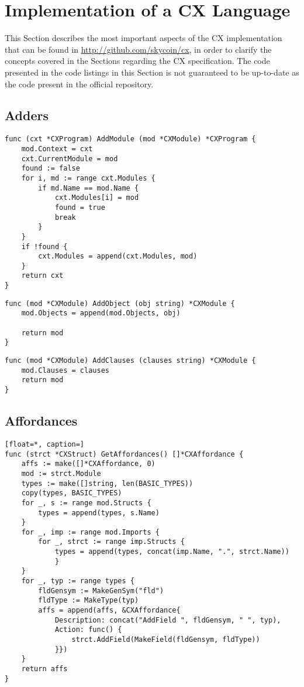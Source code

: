 \chapter{Implementation of a CX Language}
\label{implementation-of-a-cx-language}

This Section describes the most important aspects of the CX
implementation that can be found in
\url{http://github.com/skycoin/cx}, in order to clarify the concepts
covered in the Sections regarding the CX specification. The code
presented in the code listings in this Section is not guaranteed to be
up-to-date as the code present in the official repository.

\section{Adders}
\label{implementation-adders}



\begin{lstlisting}[float=*, caption=Example of an AddModule adder, label=implementation-addmodule]
func (cxt *CXProgram) AddModule (mod *CXModule) *CXProgram {
	mod.Context = cxt
	cxt.CurrentModule = mod
	found := false
	for i, md := range cxt.Modules {
		if md.Name == mod.Name {
			cxt.Modules[i] = mod
			found = true
			break
		}
	}
	if !found {
		cxt.Modules = append(cxt.Modules, mod)
	}
	return cxt
}
\end{lstlisting}

\begin{lstlisting}[float=*, caption=Example of an AddObject adder, label=implementation-addobject]
func (mod *CXModule) AddObject (obj string) *CXModule {
	mod.Objects = append(mod.Objects, obj)

	return mod
}
\end{lstlisting}

\begin{lstlisting}[float=*, caption=Example of an AddClauses adder, label=implementation-addclauses]
func (mod *CXModule) AddClauses (clauses string) *CXModule {
	mod.Clauses = clauses
	return mod
}
\end{lstlisting}

\section{Affordances}
\label{implementation-affordances}

\begin{lstlisting}[float=*, caption=]
func (strct *CXStruct) GetAffordances() []*CXAffordance {
	affs := make([]*CXAffordance, 0)
	mod := strct.Module
	types := make([]string, len(BASIC_TYPES))
	copy(types, BASIC_TYPES)
	for _, s := range mod.Structs {
		types = append(types, s.Name)
	}
	for _, imp := range mod.Imports {
		for _, strct := range imp.Structs {
			types = append(types, concat(imp.Name, ".", strct.Name))
	       	}
	}
	for _, typ := range types {
		fldGensym := MakeGenSym("fld")
		fldType := MakeType(typ)
		affs = append(affs, &CXAffordance{
			Description: concat("AddField ", fldGensym, " ", typ),
			Action: func() {
				strct.AddField(MakeField(fldGensym, fldType))
			}})
	}
	return affs
}
\end{lstlisting}

